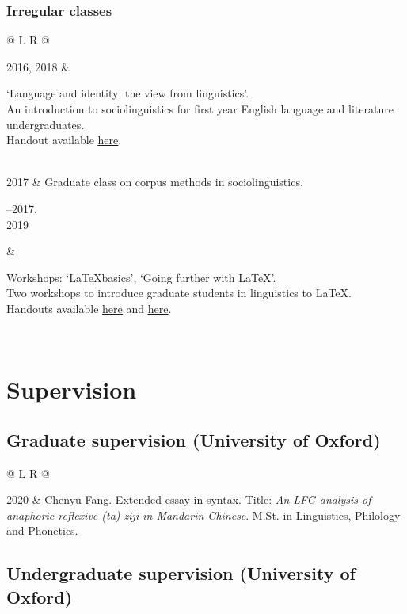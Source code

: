 \documentclass[11pt,a4paper]{article}
\makeatletter
\newcommand{\datewidth}{0.15}
\newcommand{\bodywidth}{0.82}
\newenvironment{cvsection}{%
  \setlength{\extrarowheight}{0.70ex}
  \begin{longtable}[l]{@{} L R @{}}
}{%
  \end{longtable}
}
\newcommand{\longdate}[1]{\parbox[t]{\datewidth\textwidth}{\raggedleft
#1}}
\newcommand{\Note}[2]{%
\parbox[t]{\bodywidth\textwidth}{#1\\[-0.15em]{\footnotesize #2}}%
}
\makeatother
\begin{document}
\subsubsection*{Irregular classes}
\begin{cvsection}
    2016, 2018	& \Note{%
                  `Language and identity: the view from linguistics'.}
                  {An introduction to sociolinguistics for first year English language and literature undergraduates.\\
                  Handout available \href{http://users.ox.ac.uk/~sjoh2787/socio_presentation.pdf}{\uline{here}}.}\\
    2017        & Graduate class on corpus methods in sociolinguistics.\\
    \longdate{2016--2017,\\[-0.5em] 2019}	& \Note{%
                  Workshops: `\LaTeX* basics', `Going further with \LaTeX*'.}
                  {Two workshops to introduce graduate students in linguistics to \LaTeX*.\\
                  Handouts available \href{http://users.ox.ac.uk/~sjoh2787/latex-basics.pdf}{\uline{here}} and \href{http://users.ox.ac.uk/~sjoh2787/latex-going-further.pdf}{\uline{here}}.}\\
\end{cvsection}

\section*{Supervision}

\subsection*{Graduate supervision (University of Oxford)}

\begin{cvsection}
    2020    & Chenyu Fang. Extended essay in syntax. Title: \textit{An LFG analysis of anaphoric reflexive \emph{(ta)-ziji} in Mandarin Chinese}. M.St. in Linguistics, Philology and Phonetics.
\end{cvsection}

\subsection*{Undergraduate supervision (University of Oxford)}
\end{document}

